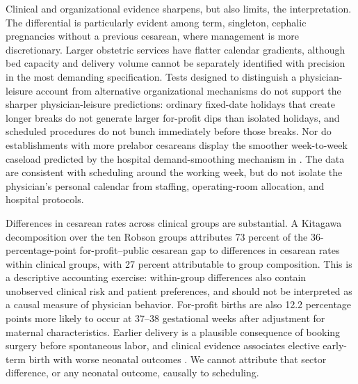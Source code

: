 \documentclass[12pt]{article}
\begin{document}
Clinical and organizational evidence sharpens, but also limits, the interpretation. The differential is particularly evident among term, singleton, cephalic pregnancies without a previous cesarean, where management is more discretionary. Larger obstetric services have flatter calendar gradients, although bed capacity and delivery volume cannot be separately identified with precision in the most demanding specification. Tests designed to distinguish a physician-leisure account from alternative organizational mechanisms do not support the sharper physician-leisure predictions: ordinary fixed-date holidays that create longer breaks do not generate larger for-profit dips than isolated holidays, and scheduled procedures do not bunch immediately before those breaks. Nor do establishments with more prelabor cesareans display the smoother week-to-week caseload predicted by the hospital demand-smoothing mechanism in \citet{elejalde2021}. The data are consistent with scheduling around the working week, but do not isolate the physician's personal calendar from staffing, operating-room allocation, and hospital protocols.

Differences in cesarean rates across clinical groups are substantial. A Kitagawa decomposition over the ten Robson groups attributes 73 percent of the 36-percentage-point for-profit–public cesarean gap to differences in cesarean rates within clinical groups, with 27 percent attributable to group composition. This is a descriptive accounting exercise: within-group differences also contain unobserved clinical risk and patient preferences, and should not be interpreted as a causal measure of physician behavior. For-profit births are also 12.2 percentage points more likely to occur at 37–38 gestational weeks after adjustment for maternal characteristics. Earlier delivery is a plausible consequence of booking surgery before spontaneous labor, and clinical evidence associates elective early-term birth with worse neonatal outcomes \citep{tita2009}. We cannot attribute that sector difference, or any neonatal outcome, causally to scheduling.
\end{document}
